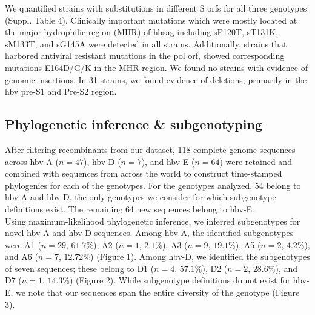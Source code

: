 We quantified strains with substitutions in different S \gls{orf}s for all three genotypes (Suppl. Table 4).
Clinically important mutations which were mostly located at the major hydrophilic region (MHR) of \gls{hbsag} including sP120T, sT131K, sM133T, and sG145A were detected in all strains.
Additionally, strains that harbored antiviral resistant mutations in the pol \gls{orf}, showed corresponding mutations E164D/G/K in the MHR region.
We found no strains with evidence of genomic insertions.
In 31 strains, we found evidence of deletions, primarily in the \gls{hbv} pre-S1 and Pre-S2 region.

\subsection{Phylogenetic inference \& subgenotyping}
After filtering recombinants from our dataset, 118 complete genome sequences across \gls{hbv}-A ($n=47$), \gls{hbv}-D ($n=7$), and \gls{hbv}-E ($n=64$) were retained and combined with sequences from across the world to construct time-stamped phylogenies for each of the genotypes.
For the genotypes analyzed, 54 belong to \gls{hbv}-A and \gls{hbv}-D, the only genotypes we consider for which subgenotype definitions exist.
The remaining 64 new sequences belong to \gls{hbv}-E.\\

Using maximum-likelihood phylogenetic inference, we inferred subgenotypes for novel \gls{hbv}-A and \gls{hbv}-D sequences.
Among \gls{hbv}-A, the identified subgenotypes were A1 ($n=29$, $61.7\%$), A2 ($n=1$, $2.1\%$), A3 ($n=9$, $19.1\%$), A5 ($n=2$, $4.2\%$), and A6 ($n=7$, $12.72\%$) (Figure 1).
Among \gls{hbv}-D, we identified the subgenotypes of seven sequences; these belong to D1 ($n=4$, $57.1\%$), D2 ($n=2$, $28.6\%$), and D7 ($n=1$, $14.3\%$) (Figure 2).
While subgenotype definitions do not exist for \gls{hbv}-E, we note that our sequences span the entire diversity of the genotype (Figure 3).\\


